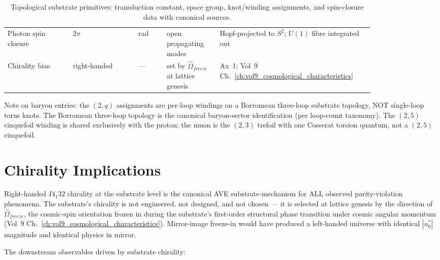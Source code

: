 \begin{table}[htbp]
\begin{tabular}{p{0.16\linewidth} p{0.16\linewidth} p{0.07\linewidth} p{0.13\linewidth} p{0.32\linewidth}}
Photon spin closure & $2\pi$ & rad & open propagating modes & Hopf-projected to $S^2$; $U(1)$ fibre integrated out \\
Chirality bias & right-handed & --- & set by $\hat{\Omega}_{freeze}$ at lattice genesis & Ax~1; Vol~9 Ch.~\ref{ch:vol9_cosmological_characteristics} \\
\bottomrule
\end{tabular}
\caption{Topological substrate primitives: transduction constant, space group, knot/winding assignments, and spin-closure data with canonical sources.}
\label{tab:vol9_topological_spec}
\end{table}

\noindent
Note on baryon entries: the $(2, q)$ assignments are per-loop windings on a Borromean three-loop substrate topology, NOT single-loop torus knots. The Borromean three-loop topology is the canonical baryon-sector identification (per  loop-count taxonomy). The $(2, 5)$ cinquefoil winding is shared exclusively with the proton; the muon is the $(2, 3)$ trefoil with one Cosserat torsion quantum, not a $(2, 5)$ cinquefoil.

\section{Chirality Implications}
\label{sec:vol9_chirality_implications}

Right-handed $I4_1 32$ chirality at the substrate level is the canonical AVE substrate-mechanism for ALL observed parity-violation phenomena. The substrate's chirality is not engineered, not designed, and not chosen --- it is selected at lattice genesis by the direction of $\hat{\Omega}_{freeze}$, the cosmic-spin orientation frozen in during the substrate's first-order structural phase transition under cosmic angular momentum (Vol~9 Ch.~\ref{ch:vol9_cosmological_characteristics}). Mirror-image freeze-in would have produced a left-handed universe with identical $|u_0^*|$ magnitude and identical physics in mirror.

The downstream observables driven by substrate chirality:

